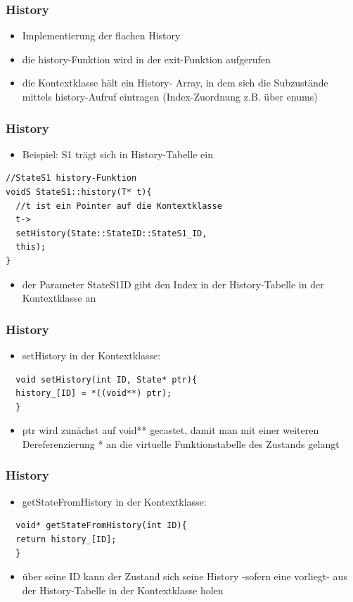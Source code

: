 \documentclass{beamer}
\begin{document}
\begin{frame}
  \frametitle{History}
  \begin{itemize}
  \item Implementierung der flachen History
  \item die history-Funktion  wird in der exit-Funktion aufgerufen
  \item die Kontextklasse h\"alt ein History- Array,
   in dem sich die Subzust\"ande mittels history-Aufruf eintragen (Index-Zuordnung z.B. \"uber enums)
  \end{itemize}
\end{frame}

\begin{frame}[fragile]
  \frametitle{History}
  \begin{itemize}
  \item Beispiel: S1 tr\"agt sich in History-Tabelle ein
  \end{itemize}
  \begin{lstlisting}
//StateS1 history-Funktion
voidS StateS1::history(T* t){
  //t ist ein Pointer auf die Kontextklasse
  t->
  setHistory(State::StateID::StateS1_ID,
  this);
}
  \end{lstlisting}
  \begin{itemize}
  \item der Parameter StateS1ID gibt den Index in der History-Tabelle in der Kontextklasse an
  \end{itemize}
\end{frame}

\begin{frame}[fragile]
  \frametitle{History}
  \begin{itemize}
  \item setHistory in der Kontextklasse:
  \end{itemize}
  \begin{lstlisting}
  void setHistory(int ID, State* ptr){
  history_[ID] = *((void**) ptr);
  }
  \end{lstlisting}
  \begin{itemize}
  \item ptr wird zun\"achst auf void** gecastet, damit man mit einer weiteren Dereferenzierung * an die virtuelle Funktionstabelle des Zustands gelangt
  \end{itemize}
\end{frame}

\begin{frame}[fragile]
  \frametitle{History}
  \begin{itemize}
  \item getStateFromHistory in der Kontextklasse:
  \end{itemize}
  \begin{lstlisting}
  void* getStateFromHistory(int ID){
  return history_[ID];
  }
  \end{lstlisting}
  \begin{itemize}
  \item \"uber seine ID kann der Zustand sich seine History -sofern eine vorliegt- aus der History-Tabelle in der Kontextklasse holen
  \end{itemize}
\end{frame}
\end{document}
